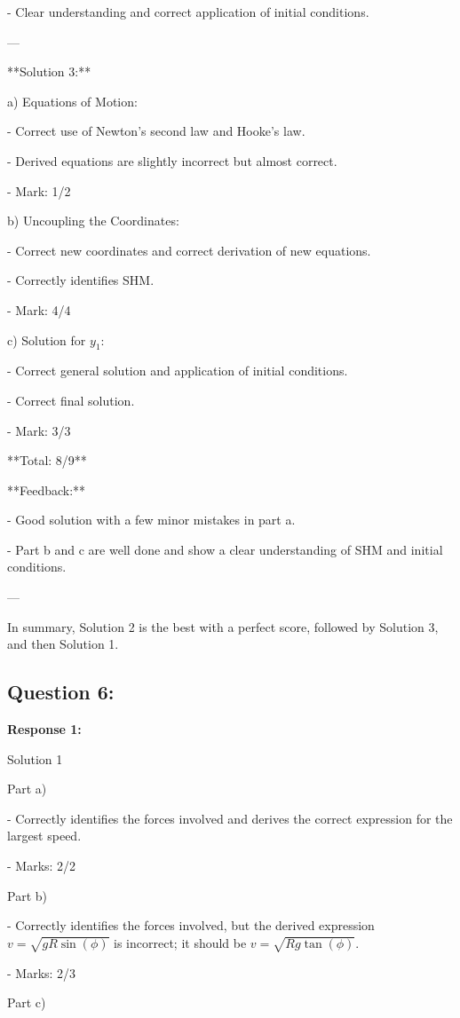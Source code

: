 \documentclass[a4paper,11pt]{article}
\begin{document}
- Clear understanding and correct application of initial conditions.

---

**Solution 3:**

a) Equations of Motion:

- Correct use of Newton's second law and Hooke's law.

- Derived equations are slightly incorrect but almost correct.

- Mark: 1/2

b) Uncoupling the Coordinates:

- Correct new coordinates and correct derivation of new equations.

- Correctly identifies SHM.

- Mark: 4/4

c) Solution for \( y_1 \):

- Correct general solution and application of initial conditions.

- Correct final solution.

- Mark: 3/3

**Total: 8/9**

**Feedback:**

- Good solution with a few minor mistakes in part a.

- Part b and c are well done and show a clear understanding of SHM and initial conditions.

---

In summary, Solution 2 is the best with a perfect score, followed by Solution 3, and then Solution 1.



\subsection*{Question 6:}

\textbf{Response 1:}

Solution 1

Part a)

- Correctly identifies the forces involved and derives the correct expression for the largest speed.

- Marks: 2/2

Part b)

- Correctly identifies the forces involved, but the derived expression \( v = \sqrt{gR\sin(\phi)} \) is incorrect; it should be \( v = \sqrt{Rg\tan(\phi)} \).

- Marks: 2/3

Part c)
\end{document}
